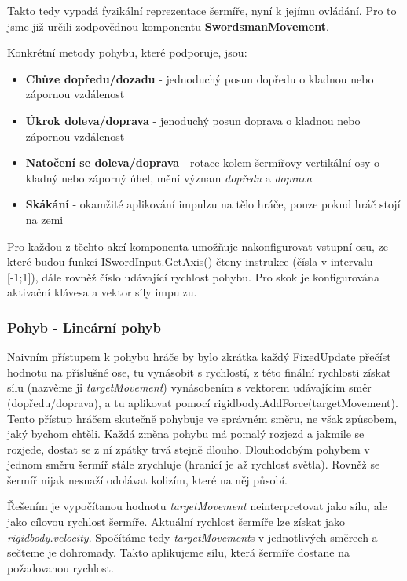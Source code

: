 Takto tedy vypadá fyzikální reprezentace šermíře, nyní k jejímu ovládání. Pro to jsme již určili zodpovědnou komponentu \textbf{SwordsmanMovement}. 

Konkrétní metody pohybu, které podporuje, jsou:
\begin{itemize}
  \item \textbf{Chůze dopředu/dozadu} - jednoduchý posun dopředu o kladnou nebo zápornou vzdálenost
  \item \textbf{Úkrok doleva/doprava} - jenoduchý posun doprava o kladnou nebo zápornou vzdálenost
  \item \textbf{Natočení se doleva/doprava} - rotace kolem šermířovy vertikální osy o kladný nebo záporný úhel, mění význam \textit{dopředu} a \textit{doprava}
  \item \textbf{Skákání} - okamžité aplikování impulzu na tělo hráče, pouze pokud hráč stojí na zemi
\end{itemize}

Pro každou z těchto akcí komponenta umožňuje nakonfigurovat vstupní osu, ze které budou funkcí ISwordInput.GetAxis() čteny instrukce (čísla v intervalu [-1;1]), dále rovněž číslo udávající rychlost pohybu. Pro skok je konfigurována aktivační klávesa a vektor síly impulzu.

\subsubsection*{Pohyb - Lineární pohyb}

Naivním přístupem k pohybu hráče by bylo zkrátka každý FixedUpdate přečíst hodnotu na příslušné ose, tu vynásobit s rychlostí, z této finální rychlosti získat sílu (nazvěme ji \textit{targetMovement}) vynásobením s vektorem udávajícím směr (dopředu/doprava), a tu aplikovat pomocí rigidbody.AddForce(targetMovement).
Tento přístup hráčem skutečně pohybuje ve správném směru, ne však způsobem, jaký bychom chtěli. Každá změna pohybu má pomalý rozjezd a jakmile se rozjede, dostat se z ní zpátky trvá stejně dlouho. Dlouhodobým pohybem v jednom směru šermíř stále zrychluje (hranicí je až rychlost světla). Rovněž se šermíř nijak nesnaží odolávat kolizím, které na něj působí. 

Řešením je vypočítanou hodnotu \textit{targetMovement} neinterpretovat jako sílu, ale jako cílovou rychlost šermíře. Aktuální rychlost šermíře lze získat jako \textit{rigidbody.velocity}. Spočítáme tedy \textit{targetMovement}s v jednotlivých směrech a sečteme je dohromady. Takto aplikujeme sílu, která šermíře dostane na požadovanou rychlost. 

